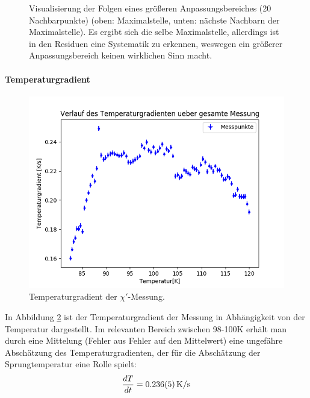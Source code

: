 \documentclass[12pt,a4paper]{article}
\begin{document}
\begin{figure}
\caption{Visualisierung der Folgen eines größeren Anpassungsbereiches (20 Nachbarpunkte) (oben: Maximalstelle, unten: nächste Nachbarn der Maximalstelle). Es ergibt sich die selbe Maximalstelle, allerdings ist in den Residuen eine Systematik zu erkennen, weswegen ein größerer Anpassungsbereich keinen wirklichen Sinn macht.}
\label{fig:Supra_X1anpassgross}
\end{figure}

\paragraph{Temperaturgradient}
\begin{figure}
\centering
\includegraphics[scale=0.8]{Bilder/Haupt_Supra/X1_temp.png}
\caption{Temperaturgradient der $\chi'$-Messung.}
\label{fig:Supra_X1_temp}
\end{figure}

In Abbildung \ref{fig:Supra_X1_temp} ist der Temperaturgradient der Messung in Abhängigkeit von der Temperatur dargestellt. Im relevanten Bereich zwischen 98-100K erhält man durch eine Mittelung (Fehler aus Fehler auf den Mittelwert) eine ungefähre Abschätzung des Temperaturgradienten, der für die Abschätzung der Sprungtemperatur eine Rolle spielt:
\begin{equation*}
\dfrac{dT}{dt} = \SI{0.236\pm 0.005}{K/s}
\end{equation*}

\newpage
\end{document}
